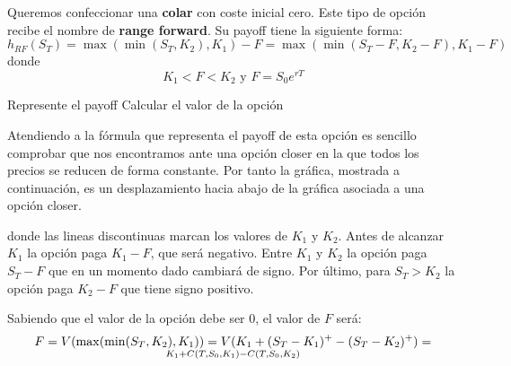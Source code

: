 \begin{problem}[5]
Queremos confeccionar una \textbf{colar} con coste inicial cero. Este tipo de opción recibe el nombre de \textbf{range forward}. Su payoff tiene la siguiente forma:
\[h_{RF}(S_T) = \max(\min(S_T,K_2),K_1)-F = \max(\min(S_T-F,K_2-F),K_1-F)\]
donde
\[K_1 < F < K_2 \text{ y } F=S_0e^{rT}\]

\ppart Represente el payoff
\ppart Calcular el valor de la opción
\solution
{}

\spart
Atendiendo a la fórmula que representa el payoff de esta opción es sencillo comprobar que nos encontramos ante una opción closer en la que todos los precios se reducen de forma constante. Por tanto la gráfica, mostrada a continuación, es un desplazamiento hacia abajo de la gráfica asociada a una opción closer.

\begin{center}
\end{center}

donde las lineas discontinuas marcan los valores de $K_1$ y $K_2$. Antes de alcanzar $K_1$ la opción paga $K_1-F$, que será negativo. Entre $K_1$ y $K_2$ la opción paga $S_T-F$ que en un momento dado cambiará de signo. Por último, para $S_T>K_2$ la opción paga $K_2-F$ que tiene signo positivo.

\spart

Sabiendo que el valor de la opción debe ser 0, el valor de $F$ será:
\[F=V(\max(\min(S_T,K_2),K_1)) = V(K_1 + (S_T-K_1)^+ - (S_T-K_2)^+) = \atop K_1 + C(T,S_0,K_1)-C(T,S_0,K_2)\]

\end{problem}

